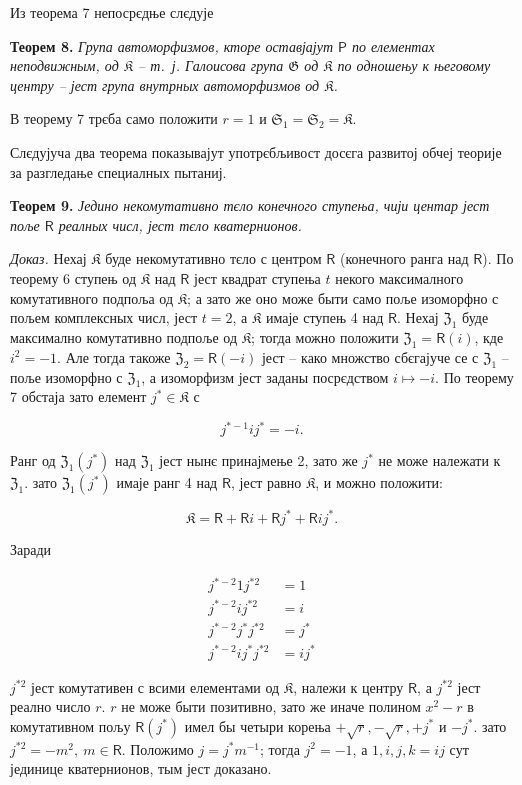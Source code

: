 \documentclass[11pt]{article}
\begin{document}
Из теорема 7 непосрєдње слєдује

\textbf{Теорем 8.} \emph{Група автоморфизмов, кторе оставјајут \(\mathsf P\) по елементах неподвижным, од \(\mathfrak K\) -- т.~ј. Галоисова група \(\mathfrak G\) од \(\mathfrak K\) по одношењу к његовому центру -- јест група внутрных автоморфизмов од \(\mathfrak K\).}

В теорему 7 трєба само положити \(r=1\) и \(\mathfrak S_1=\mathfrak S_2=\mathfrak K\).

Слєдујуча два теорема показывајут употрєбљивост досєга развитој обчеј теорије за разгледање специалных пытаниј.

\textbf{Теорем 9.} \emph{Једино некомутативно тєло конечного ступења, чији центар јест поље \(\mathsf{R}\) реалных числ, јест тєло кватернионов.}

\emph{Доказ.} Нехај \(\mathfrak K\) буде некомутативно тєло с центром \(\mathsf{R}\) (конечного ранга над \(\mathsf{R}\)). По теорему 6 ступењ од \(\mathfrak K\) над \(\mathsf{R}\) јест квадрат ступења \(t\) некого максималного комутативного подпоља од \(\mathfrak K\); а зато же оно може быти само поље изоморфно с пољем комплексных числ, јест \(t=2\), а \(\mathfrak K\) имаје ступењ 4 над \(\mathsf{R}\). Нехај \(\mathfrak Z_1\) буде максимално комутативно подпоље од \(\mathfrak K\); тогда можно положити \(\mathfrak Z_1=\mathsf{R}(i)\), кде \(i^2=-1\). Але тогда такоже \(\mathfrak Z_2=\mathsf{R}(-i)\) јест -- како множство сбєгајуче се с \(\mathfrak Z_1\) -- поље изоморфно с \(\mathfrak Z_1\), а изоморфизм јест заданы посрєдством \(i\mapsto -i\). По теорему 7 обстаја зато елемент \(j^*\in\mathfrak K\) с

\[
j^{*-1}ij^*=-i.
\]

Ранг од \(\mathfrak Z_1(j^*)\) над \(\mathfrak Z_1\) јест нынє принајмење 2, зато же \(j^*\) не може належати к \(\mathfrak Z_1\). зато \(\mathfrak Z_1(j^*)\) имаје ранг 4 над \(\mathsf{R}\), јест равно \(\mathfrak K\), и можно положити:

\[
\mathfrak K=\mathsf R+\mathsf Ri+\mathsf Rj^*+\mathsf Rij^*.
\]

Заради

\[
\begin{aligned}
j^{*-2}1j^{*2}&=1\\
j^{*-2}ij^{*2}&=i\\
j^{*-2}j^*j^{*2}&=j^*\\
j^{*-2}ij^*j^{*2}&=ij^*
\end{aligned}
\]

\(j^{*2}\) јест комутативен с всими елементами од \(\mathfrak K\), належи к центру \(\mathsf{R}\), а \(j^{*2}\) јест реално число \(r\). \(r\) не може быти позитивно, зато же иначе полином \(x^2-r\) в комутативном пољу \(\mathsf{R}(j^*)\) имел бы четыри корења \(+\sqrt r,-\sqrt r,+j^*\) и \(-j^*\). зато \(j^{*2}=-m^2,\ m\in \mathsf{R}\). Положимо \(j=j^*m^{-1}\); тогда \(j^2=-1\), а \(1,i,j,k=ij\) сут јединице кватернионов, тым јест доказано.
\end{document}
